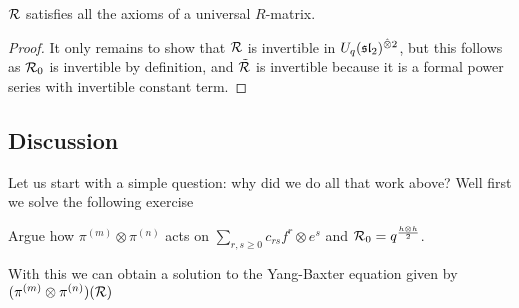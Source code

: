 \documentclass{article}
\begin{document}
\begin{theorem}
$\mathcal{R}$ satisfies all the axioms of a universal $R$-matrix. 
\end{theorem}
\begin{proof}
It only remains to show that $\mathcal{R}$ is invertible in $U_q(\mathfrak{sl}_2)^{\hat{\otimes}2}$, but this follows as $\mathcal{R}_0$ is invertible by definition, and $\tilde{\mathcal{R}}$ is invertible because it is a formal power series with invertible constant term. 
\end{proof}

\subsection{Discussion}

Let us start with a simple question: why did we do all that work above? Well first we solve the following exercise

\begin{ex}
Argue how $\pi^{(m)} \otimes \pi^{(n)}$ acts on $\sum_{r,s \geq 0} c_{rs} f^r \otimes e^s$ and $\mathcal{R}_0 = q^{\frac{h \otimes h}{2}}$. 
\end{ex}

With this we can obtain a solution to the Yang-Baxter equation given by $(\pi^{(m)} \otimes \pi^{(n)})(\mathcal{R})$
\end{document}
